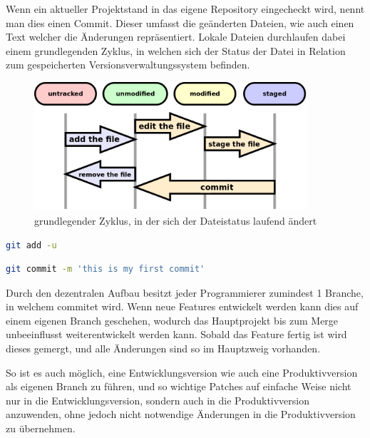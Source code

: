 Wenn ein aktueller Projektstand in das eigene Repository eingecheckt wird, nennt man dies einen Commit. Dieser umfasst die ge\"anderten Dateien, wie auch einen Text welcher die \"Anderungen repr\"asentiert. Lokale Dateien durchlaufen dabei einem grundlegenden Zyklus, in welchen sich der Status der Datei in Relation zum gespeicherten Versionsverwaltungssystem befinden.

\begin{figure}[h]
\centering
\includegraphics[width=0.9\textwidth]{./media/images/development/git_file_status_livecycle.png}
\caption{grundlegender Zyklus, in der sich der Dateistatus laufend \"andert}
\label{git_file_status_livecycle}
\end{figure}


\begin{lstlisting}[language=bash]
git add -u
\end{lstlisting}


\begin{lstlisting}[language=bash]
git commit -m 'this is my first commit'
\end{lstlisting}

\newpage

Durch den dezentralen Aufbau besitzt jeder Programmierer zumindest 1 Branche, in welchem commitet wird. Wenn neue Features entwickelt werden kann dies auf einem eigenen Branch geschehen, wodurch das Hauptprojekt bis zum Merge unbeeinflusst weiterentwickelt werden kann. Sobald das Feature fertig ist wird dieses gemergt, und alle \"Anderungen sind so im Hauptzweig vorhanden.

So ist es auch m\"oglich, eine Entwicklungsversion wie auch eine Produktivversion als eigenen Branch zu f\"uhren, und so wichtige Patches auf einfache Weise nicht nur in die Entwicklungsversion, sondern auch in die Produktivversion anzuwenden, ohne jedoch nicht notwendige \"Anderungen in die Produktivversion zu \"ubernehmen.

